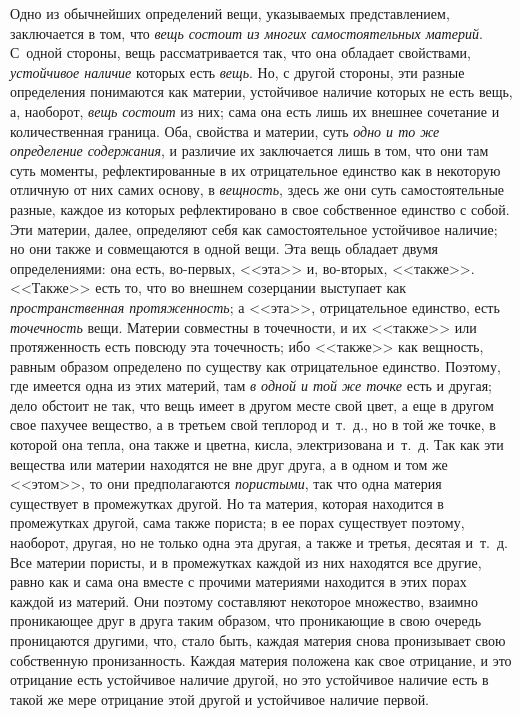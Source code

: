 Одно из обычнейших определений вещи, указываемых представлением, заключается
в том, что {\em вещь состоит из многих самостоятельных
материй}. С~одной стороны, вещь рассматривается так, что она обладает
свойствами, {\em устойчивое наличие} которых есть
{\em вещь}. Но, с другой стороны, эти разные
определения понимаются как материи, устойчивое наличие которых не есть
вещь, а, наоборот, {\em вещь состоит} из них; сама она
есть лишь их внешнее сочетание и количественная граница. Оба, свойства и
материи, суть {\em одно и то же определение
содержания}, и различие их заключается лишь в том, что они там суть
моменты, рефлектированные в их отрицательное единство как в некоторую
отличную от них самих основу, в {\em вещность}, здесь
же они суть самостоятельные разные, каждое из которых рефлектировано в свое
собственное единство с собой. Эти материи, далее, определяют себя как
самостоятельное устойчивое наличие; но они также и совмещаются в одной
вещи. Эта вещь обладает двумя определениями: она есть, во-первых, <<эта>> и,
во-вторых, <<также>>. <<Также>> есть то, что во внешнем созерцании выступает
как {\em пространственная протяженность}; а <<эта>>,
отрицательное единство, есть {\em точечность} вещи.
Материи совместны в точечности, и их <<также>> или протяженность есть повсюду
эта точечность; ибо <<также>> как вещность, равным образом определено по
существу как отрицательное единство. Поэтому, где имеется одна из этих
материй, там {\em в одной и той же точке} есть и
другая; дело обстоит не так, что вещь имеет в другом месте свой цвет, а еще
в другом свое пахучее вещество, а в третьем свой теплород и~т.~д., но в той
же точке, в которой она тепла, она также и цветна, кисла, электризована
и~т.~д. Так как эти вещества или материи находятся не вне друг друга, а в
одном и том же <<этом>>, то они предполагаются
{\em пористыми}, так что одна материя существует в
промежутках другой. Но та материя, которая находится в промежутках другой,
сама также пориста; в ее порах существует поэтому, наоборот, другая, но не
только одна эта другая, а также и третья, десятая и~т.~д. Все материи
пористы, и в промежутках каждой из них находятся все другие, равно как и
сама она вместе с прочими материями находится в этих порах каждой из
материй. Они поэтому составляют некоторое множество, взаимно проникающее
друг в друга таким образом, что проникающие в свою очередь проницаются
другими, что, стало быть, каждая материя снова пронизывает свою собственную
пронизанность. Каждая материя положена как свое отрицание, и это отрицание
есть устойчивое наличие другой, но это устойчивое наличие есть в такой же
мере отрицание этой другой и устойчивое наличие первой.

